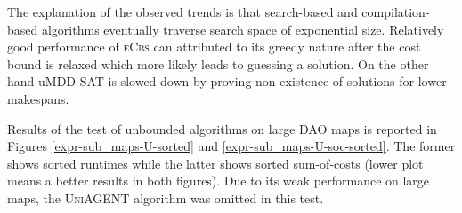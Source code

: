 \documentclass[jair,oneside,11pt]{article}
\begin{document}
The explanation of the observed trends is that search-based and compilation-based algorithms eventually traverse search space of exponential size. Relatively good performance of \textsc{eCbs} can attributed to its greedy nature after the cost bound is relaxed which more likely leads to guessing a solution. On the other hand uMDD-SAT is slowed down by proving non-existence of solutions for lower makespans.


Results of the test of unbounded algorithms on large DAO maps is reported in Figures \ref{expr-sub_maps-U-sorted} and  \ref{expr-sub_maps-U-soc-sorted}. The former shows sorted runtimes while the latter shows sorted sum-of-costs (lower plot means a better results in both figures). Due to its weak performance on large maps, the \textsc{UniAGENT} algorithm was omitted in this test.
\end{document}
